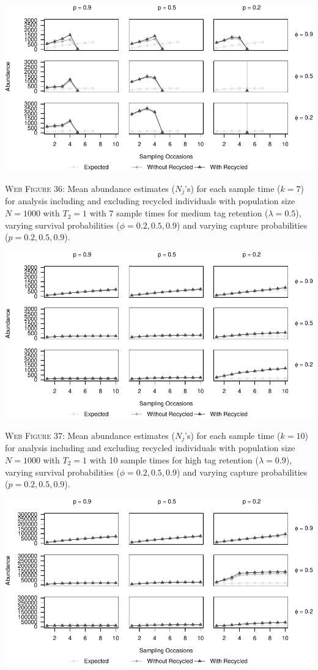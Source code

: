 \documentclass[]{article}
\begin{document}
\includegraphics{Appendix_BW_files/figure-latex/36_abundance_M_GJSTL6-1.pdf}

\textsc{Web Figure 36:} Mean abundance estimates (\(N_j\)'s) for each
sample time (\(k=7\)) for analysis including and excluding recycled
individuals with population size \(N=1000\) with \(T_2=1\) with 7 sample times for medium tag retention (\(\lambda=0.5\)), varying survival
probabilities (\(\phi=0.2,0.5,0.9\)) and varying capture probabilities
(\(p=0.2,0.5,0.9\)).

\newpage

\includegraphics{Appendix_BW_files/figure-latex/37_abundance_H_GJSTL1-1.pdf}

\textsc{Web Figure 37:} Mean abundance estimates (\(N_j\)'s) for each
sample time (\(k=10\)) for analysis including and excluding recycled
individuals with population size \(N=1000\) with \(T_2=1\) with 10 sample times for high tag retention (\(\lambda=0.9\)), varying survival
probabilities (\(\phi=0.2,0.5,0.9\)) and varying capture probabilities
(\(p=0.2,0.5,0.9\)).

\includegraphics{Appendix_BW_files/figure-latex/38_abundance_H_GJSTL2-1.pdf}
\end{document}
